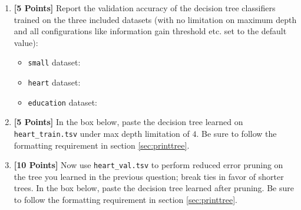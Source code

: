 \begin{enumerate}
    \item {\bf [5 Points]} Report the validation accuracy of the decision tree classifiers trained on the three included datasets (with no limitation on maximum depth and all configurations like information gain threshold etc. set to the default value):

        \begin{itemize}
            \item \texttt{small} dataset: 
            \begin{tcolorbox}[fit,height=0.5cm, width=3cm, blank, borderline={1pt}{-2pt},nobeforeafter]
            \end{tcolorbox}

            
            \item \texttt{heart} dataset:
            \begin{tcolorbox}[fit,height=0.5cm, width=3cm, blank, borderline={1pt}{-2pt},nobeforeafter]
            \end{tcolorbox}

            
            \item \texttt{education} dataset: 
            \begin{tcolorbox}[fit,height=0.5cm, width=3cm, blank, borderline={1pt}{-2pt},nobeforeafter]
            \end{tcolorbox}
        \end{itemize}

    \item {\bf [5 Points]} In the box below, paste the decision tree learned on \texttt{heart\_train.tsv} under max depth limitation of $4$. Be sure to follow the formatting requirement in section \ref{sec:printtree}.

    \begin{tcolorbox}[fit,height=17cm, width=15cm, blank, borderline={1pt}{-2pt},nobeforeafter]
    
    \end{tcolorbox}
    

\item {\bf [10 Points]} Now use \texttt{heart\_val.tsv} to perform reduced error pruning on the tree you learned in the previous question; break ties in favor of shorter trees. In the box below, paste the decision tree learned after pruning. Be sure to follow the formatting requirement in section \ref{sec:printtree}.


\end{enumerate}
